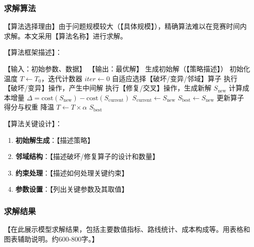 \documentclass[12pt,letterpaper]{ctexart}
\numberwithin{equation}{section}
\numberwithin{figure}{section}
\numberwithin{table}{section}
\begin{document}
\subsubsection{求解算法}

【算法选择理由】由于问题规模较大（【具体规模】），精确算法难以在竞赛时间内求解。本文采用【算法名称】进行求解。

【算法框架描述】：
\begin{algorithm}[H]
\caption{【算法名称】主流程}
\label{alg:main}
\begin{algorithmic}[1]
\REQUIRE 【输入：初始参数、数据】
\ENSURE 【输出：最优解】
\STATE 生成初始解（【策略描述】）
\STATE 初始化温度 $T \leftarrow T_0$，迭代计数器 $iter \leftarrow 0$
    \STATE 自适应选择【破坏/变异/邻域】算子
    \STATE 执行【破坏/变异】操作，产生中间解
    \STATE 执行【修复/交叉】操作，生成新解 $S_{\text{new}}$
    \STATE 计算成本增量 $\Delta = \text{cost}(S_{\text{new}}) - \text{cost}(S_{\text{current}})$
        \STATE $S_{\text{current}} \leftarrow S_{\text{new}}$
            \STATE $S_{\text{best}} \leftarrow S_{\text{new}}$
        \ENDIF
    \ENDIF
    \STATE 更新算子得分与权重
    \STATE 降温 $T \leftarrow T \times \alpha$
\ENDFOR
\RETURN $S_{\text{best}}$
\end{algorithmic}
\end{algorithm}

【算法关键设计】：
\begin{enumerate}
    \item \textbf{初始解生成}：【描述策略】
    \item \textbf{邻域结构}：【描述破坏/修复算子的设计和数量】
    \item \textbf{约束处理}：【描述如何处理关键约束】
    \item \textbf{参数设置}：【列出关键参数及其取值】
\end{enumerate}

\subsubsection{求解结果}

【在此展示模型求解结果，包括主要数值指标、路线统计、成本构成等。用表格和图表辅助说明。约600-800字。】

\end{document}
